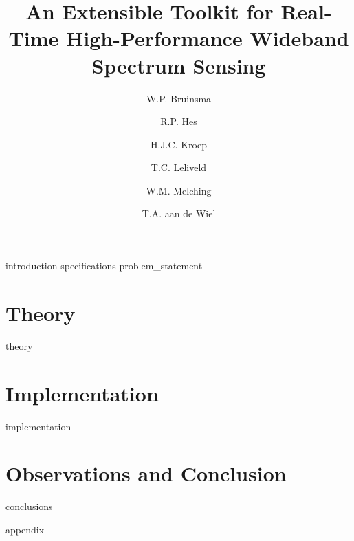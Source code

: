 \documentclass[a4paper, openany, oneside]{memoir}
\title{An Extensible Toolkit for Real-Time High-Performance Wideband Spectrum Sensing}
\author{W.P. Bruinsma \and R.P. Hes \and H.J.C. Kroep \and T.C. Leliveld \and W.M. Melching \and T.A. aan de Wiel}
\begin{document}
\frontmatter

\begin{titlingpage}
  \pagestyle{empty}
  \maketitle
\end{titlingpage}


\tableofcontents

\mainmatter
{introduction}
{specifications}
{problem_statement}

\part{Theory}
\label{prt:theory}
{theory}
\part{Implementation}
\label{prt:implementation}
{implementation}


\part{Observations and Conclusion}
{conclusions}

\clearpage

\printbibliography

\clearpage
{}
{appendix}
\end{document}
